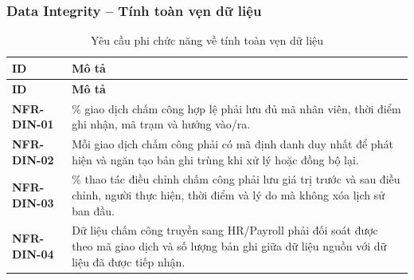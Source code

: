 \subsubsection{Data Integrity -- Tính toàn vẹn dữ liệu}
\begingroup
\small
\renewcommand{\arraystretch}{1.2}
\begin{longtable}{|>{\centering\arraybackslash}m{3cm}|>{\raggedright\arraybackslash}m{12.9cm}|}
    \caption{Yêu cầu phi chức năng về tính toàn vẹn dữ liệu}\label{tab:nfr-data-integrity}\\
    \hline
    \textbf{ID} & \textbf{Mô tả}\\
    \hline
    \endfirsthead
    \hline
    \textbf{ID} & \textbf{Mô tả}\\
    \hline
    \endhead
    \hline
    \endfoot
    \hline
    \endlastfoot
    \textbf{NFR-DIN-01} & 100\% giao dịch chấm công hợp lệ phải lưu đủ mã nhân viên, thời điểm ghi nhận, mã trạm và hướng vào/ra.\\
    \hline
    \textbf{NFR-DIN-02} & Mỗi giao dịch chấm công phải có mã định danh duy nhất để phát hiện và ngăn tạo bản ghi trùng khi xử lý hoặc đồng bộ lại.\\
    \hline
    \textbf{NFR-DIN-03} & 100\% thao tác điều chỉnh chấm công phải lưu giá trị trước và sau điều chỉnh, người thực hiện, thời điểm và lý do mà không xóa lịch sử ban đầu.\\
    \hline
    \textbf{NFR-DIN-04} & Dữ liệu chấm công truyền sang HR/Payroll phải đối soát được theo mã giao dịch và số lượng bản ghi giữa dữ liệu nguồn với dữ liệu đã được tiếp nhận.\\
    \hline
\end{longtable}
\endgroup


